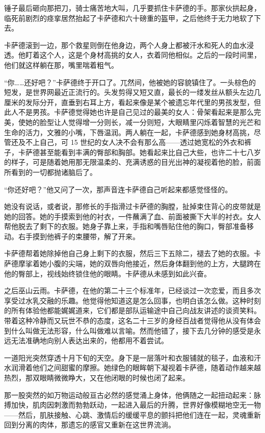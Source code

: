\documentclass[AutoFakeBold=true]{book}
\begin{document}
锤子最后砸向那把刀，骑士痛苦地大叫，几乎要抓住卡萨德的手。那家伙拱起身，临死前剧烈的痉挛居然抬起了卡萨德和六十磅重的盔甲，之后他终于无力地软了下去。

卡萨德滚到一边，那个救星则倒在他身边，两个人身上都被汗水和死人的血水浸透。他盯着这个人，这是个身材高挑的女人，衣着同他相似。之后的一段时间里，他们就这样躺在那，嘴里喘着粗气。

``你……还好吧？''卡萨德终于开口了。兀然间，他被她的容貌镇住了。一头棕色的短发，是世界网最近正流行的。头发剪得又短又直，最长的一缕发丝从额头左边几厘米的发际分开，直垂到右耳上方，看起来像是某个被遗忘年代里的男孩发型，但此人不是男孩。卡萨德觉得她也许是自己见过的最美的女人：骨架看起来是那么完美，使她的脸型让人觉得增一分则长，减一分则短，大眼睛里闪烁着智慧的光芒和生命的活力，文雅的小嘴，下唇温润。两人躺在一起，卡萨德感到她身材高挑，尽管还及不上自己，可 15 世纪的女人决不会有那么高——透过她宽松的外衣和裤子，卡萨德甚至能看到丰满的臀部和胸部。她看起来比自己大些，也许二十七八岁的样子，可是随着她用那无限温柔的、充满诱惑的目光出神的凝视着他的脸，前面所看到的一切都抛诸脑后了。

``你还好吧？''他又问了一次，那声音连卡萨德自己听起来都感觉怪怪的。

她没有说话，或者说，那修长的手指滑过卡萨德的胸膛，扯掉束住背心的皮带就是她的回答。她的手摸索到他的衬衣，一件蘸满了血、前面被撕下大半的衬衣。女人帮他脱去了剩下的衣服。她身子靠上来，手指和嘴唇贴住他的胸口，臀部准备移动。右手摸到他裤子的束腰带，解了开来。

卡萨德帮着她除掉他自己身上剩下的衣服，然后三下五除二，褪去了她的衣服。卡萨德摩挲着她小腹的尖端，她的双唇向他接近，然后身体翻到他的上方，大腿跨在他的臀部上，视线始终锁住他的眼睛。卡萨德从未感到如此兴奋。

之后巫山云雨。卡萨德，在他的第二十三个标准年，已经谈过一次恋爱，而且多次享受过水乳交融的乐趣。他觉得他知道这是怎么回事，也明白该怎么做。这种时刻的所有体验他都能娓娓道来，它们都是部队运输途中自己向战友讲述的谈资笑料。带着这种冷静而又玩世不恭的态度，这名二十三岁的身经百战者觉得他从没有体会到什么叫做无法形容，什么叫做难以言喻。然而他错了，接下去几分钟的感受是永远无法准确地向别人表达出来的，他都用不着尝试。

一道阳光突然穿透十月下旬的天空。身下是一层落叶和衣服铺就的毯子，血液和汗水润滑着他们之间甜蜜的摩擦。她绿色的眼眸朝下凝视着卡萨德，随着动作越来越热烈，那双眼睛微微睁大，又在他闭眼的时候也闭了起来。

那一股突然的如万物运动般亘古必然的感觉涌上身体，他俩随之一起扭动起来：脉搏加快，肌肉因刺激而勃勃跃动，一起进入最后的升腾，世界好像模糊地空无一物——然后，肌肤接触、心跳、激情后的缓缓平息的颤抖把他们连在一起，灵魂重新回到分离的肉体，那遗忘的感官又重新在这世界流淌。
\end{document}
